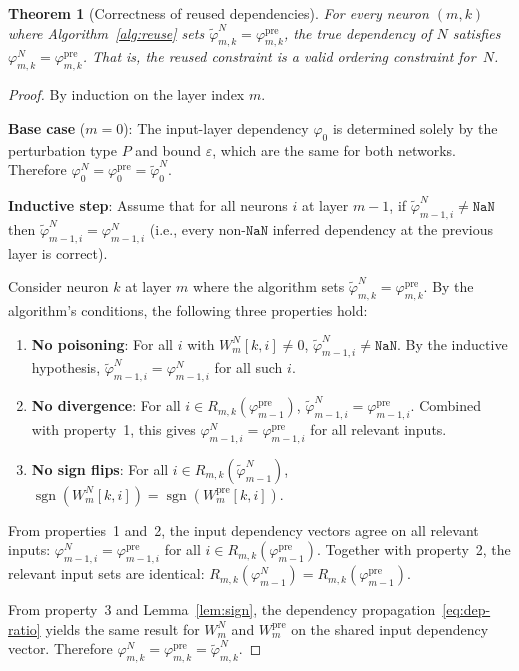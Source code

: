 \documentclass[11pt]{article}
\newtheorem{theorem}{Theorem}
\theoremstyle{definition}
\newcommand{\ep}{\varepsilon}
\newcommand{\sgn}{\operatorname{sgn}}
\begin{document}
\begin{theorem}[Correctness of reused dependencies]
  \label{thm:correct}
  For every neuron $(m,k)$ where Algorithm~\ref{alg:reuse} sets $\tilde{\varphi}_{m,k}^{N} = \varphi_{m,k}^{\mathrm{pre}}$, the true dependency of $N$ satisfies $\varphi_{m,k}^{N} = \varphi_{m,k}^{\mathrm{pre}}$. That is, the reused constraint is a valid ordering constraint for~$N$.
\end{theorem}

\begin{proof}
  By induction on the layer index $m$.

  \textbf{Base case} ($m = 0$): The input-layer dependency $\varphi_0$ is determined solely by the perturbation type $P$ and bound $\ep$, which are the same for both networks. Therefore $\varphi_0^{N} = \varphi_0^{\mathrm{pre}} = \tilde{\varphi}_0^{N}$.

  \textbf{Inductive step}: Assume that for all neurons $i$ at layer $m{-}1$, if $\tilde{\varphi}_{m-1,i}^{N} \neq \mathtt{NaN}$ then $\tilde{\varphi}_{m-1,i}^{N} = \varphi_{m-1,i}^{N}$ (i.e., every non-$\mathtt{NaN}$ inferred dependency at the previous layer is correct).

  Consider neuron $k$ at layer $m$ where the algorithm sets $\tilde{\varphi}_{m,k}^{N} = \varphi_{m,k}^{\mathrm{pre}}$. By the algorithm's conditions, the following three properties hold:

  \begin{enumerate}
    \item \textbf{No poisoning}: For all $i$ with $W_m^{N}[k,i] \neq 0$, $\tilde{\varphi}_{m-1,i}^{N} \neq \mathtt{NaN}$. By the inductive hypothesis, $\tilde{\varphi}_{m-1,i}^{N} = \varphi_{m-1,i}^{N}$ for all such $i$.

    \item \textbf{No divergence}: For all $i \in R_{m,k}(\varphi_{m-1}^{\mathrm{pre}})$, $\tilde{\varphi}_{m-1,i}^{N} = \varphi_{m-1,i}^{\mathrm{pre}}$. Combined with property~1, this gives $\varphi_{m-1,i}^{N} = \varphi_{m-1,i}^{\mathrm{pre}}$ for all relevant inputs.

    \item \textbf{No sign flips}: For all $i \in R_{m,k}(\tilde{\varphi}_{m-1}^{N})$, $\sgn(W_m^{N}[k,i]) = \sgn(W_m^{\mathrm{pre}}[k,i])$.
  \end{enumerate}

  From properties~1 and~2, the input dependency vectors agree on all relevant inputs: $\varphi_{m-1,i}^{N} = \varphi_{m-1,i}^{\mathrm{pre}}$ for all $i \in R_{m,k}(\varphi_{m-1}^{\mathrm{pre}})$. Together with property~2, the relevant input sets are identical: $R_{m,k}(\varphi_{m-1}^{N}) = R_{m,k}(\varphi_{m-1}^{\mathrm{pre}})$.

  From property~3 and Lemma~\ref{lem:sign}, the dependency propagation~\eqref{eq:dep-ratio} yields the same result for $W_m^{N}$ and $W_m^{\mathrm{pre}}$ on the shared input dependency vector. Therefore $\varphi_{m,k}^{N} = \varphi_{m,k}^{\mathrm{pre}} = \tilde{\varphi}_{m,k}^{N}$.
\end{proof}
\end{document}

